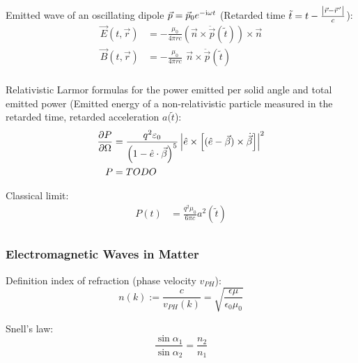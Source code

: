 			\noindent
			Emitted wave of an oscillating dipole $\vec{p} = \vec{p}_0 e^{-\mathrm{i}\omega t}$ (Retarded time $\tilde{t} = t-\frac{\left|\vec{r}-\pvec{r}'\right|}{c}$):
			\begin{equation}
				\begin{aligned}
					\vec{E}(t,\vec{r}) &= -\frac{\mu_0}{4\pi r c}	\left(\vec{n}\times\ddot{\vec{p}}(\tilde{t})\right) \times \vec{n} \\
					\vec{B}(t,\vec{r}) &= -\frac{\mu_0}{4\pi r c} \phantom{\Big(}\vec{n}\times\ddot{\vec{p}}(\tilde{t}) \\
				\end{aligned}
			\end{equation}

			\noindent
			Relativistic Larmor formulas for the power emitted per solid angle and total emitted power (Emitted energy of a non-relativistic particle measured in the retarded time, retarded acceleration $a(\tilde{t}$):
			\begin{equation}
				\begin{aligned}
					\pdv{P}{\Omega} &= \frac{q^2 \varepsilon_0}{\qty(1-\hat{e}\cdot\vec{\beta})^5} \left| \hat{e}\times\qty[(\hat{e}-\vec{\beta}) \times \dot{\vec{\beta}}] \right|^2 \\
					P &= TODO
				\end{aligned}
			\end{equation}

			\noindent 
			Classical limit:
			\begin{equation}
				\begin{aligned}
					P(t) &= \frac{q^2 \mu_0}{6\pi c}a^2(\tilde{t}) \\
				\end{aligned}
			\end{equation}
			

		\subsubsection{Electromagnetic Waves in Matter}
			\noindent
			Definition index of refraction (phase velocity $v_{PH}$):
			\begin{equation}
				n(k) := \frac{c}{v_{PH}(k)} = \sqrt{\frac{\epsilon\mu}{\epsilon_0\mu_0}}
			\end{equation}

			\noindent
			Snell's law:
			\begin{equation}
				\frac{\sin\alpha_1}{\sin\alpha_2} = \frac{n_2}{n_1}
			\end{equation}



